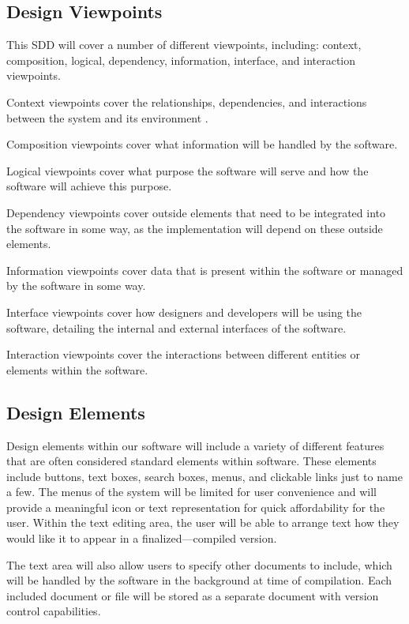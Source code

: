 \documentclass[letterpaper, 10pt, draftclsnofoot, compsoc, onecolumn]{IEEEtran}
\begin{document}
\subsection{Design Viewpoints}
{\noindent This SDD will cover a number of different viewpoints, including: 
context, composition, logical, dependency, information, interface, and interaction viewpoints.

Context viewpoints cover the relationships, dependencies, and 
interactions between the system and its environment \cite{viewpoints}. 

Composition viewpoints cover what information will be handled by the software. 

Logical viewpoints cover what purpose the software will serve and how the software will achieve this purpose. 

Dependency viewpoints cover outside elements that need to be integrated 
into the software in some way, as the implementation will depend on these outside elements. 

Information viewpoints cover data that is present within the software or managed by the software in some way. 

Interface viewpoints cover how designers and developers will be using the software, 
detailing the internal and external interfaces of the software. 

Interaction viewpoints cover the interactions between different entities or elements within the software. \par}

\subsection{Design Elements}
{\noindent Design elements within our software will include a variety of different 
features that are often considered standard elements within software. 
These elements include buttons, text boxes, search boxes, menus, and clickable links just to name a few. 
The menus of the system will be limited for user convenience and will provide a meaningful icon or text representation
for quick affordability for the user. Within the text editing area, the user will be able to arrange 
text how they would like it to appear in a finalized---compiled version.

The text area will also allow users to specify other documents to include, 
which will be handled by the software in the background at time of compilation. 
Each included document or file will be stored as a separate document with version control capabilities. \par}
\end{document}
